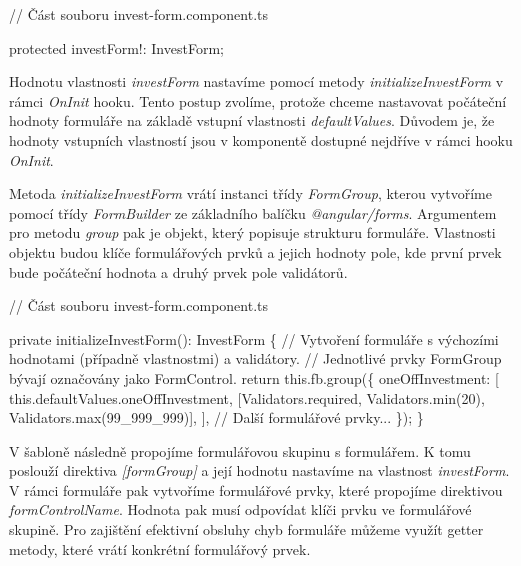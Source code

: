 \begin{prog}
// Část souboru invest-form.component.ts

protected investForm!: InvestForm;
\end{prog}

Hodnotu vlastnosti \emph{investForm} nastavíme pomocí metody \emph{initializeInvestForm} v rámci \emph{OnInit} hooku. 
Tento postup zvolíme, protože chceme nastavovat počáteční hodnoty formuláře na základě vstupní vlastnosti \emph{defaultValues}.
Důvodem je, že hodnoty vstupních vlastností jsou v komponentě dostupné nejdříve v rámci hooku \emph{OnInit}.

Metoda \emph{initializeInvestForm} vrátí instanci třídy \emph{FormGroup}, kterou vytvoříme pomocí třídy \emph{FormBuilder} ze základního balíčku \emph{@angular/forms}. 
Argumentem pro metodu \emph{group} pak je objekt, který popisuje strukturu formuláře. 
Vlastnosti objektu budou klíče formulářových prvků a jejich hodnoty pole, kde první prvek bude počáteční hodnota a druhý prvek pole validátorů.

\begin{prog}
// Část souboru invest-form.component.ts

private initializeInvestForm(): InvestForm \{
  // Vytvoření formuláře s výchozími hodnotami 
    (případně vlastnostmi) a validátory.
  // Jednotlivé prvky FormGroup bývají označovány jako FormControl.
  return this.fb.group(\{
    oneOffInvestment: [
      this.defaultValues.oneOffInvestment,
      [Validators.required, Validators.min(20), Validators.max(99_999_999)],
    ],
    // Další formulářové prvky... 
  \});
\}
\end{prog}

V šabloně následně propojíme formulářovou skupinu s formulářem. K tomu poslouží direktiva \emph{[formGroup]} a její hodnotu nastavíme na vlastnost \emph{investForm}. 
V rámci formuláře pak vytvoříme formulářové prvky, které propojíme direktivou \emph{formControlName}. Hodnota pak musí odpovídat klíči prvku ve formulářové skupině. 
Pro zajištění efektivní obsluhy chyb formuláře můžeme využít getter metody, které vrátí konkrétní formulářový prvek.

